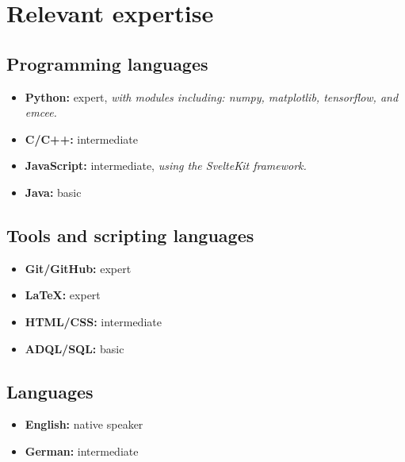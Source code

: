 \documentclass[12pt, letterpaper]{hunt-cv}
\begin{document}
\section*{Relevant expertise}

\subsection*{Programming languages}

\begin{itemize}
    \item \textbf{Python:} expert, \emph{with modules including: numpy, matplotlib, tensorflow, and emcee.}
    \item \textbf{C/C++:} intermediate
    \item \textbf{JavaScript:} intermediate, \emph{using the SvelteKit framework.}
    \item \textbf{Java:} basic
\end{itemize}

\subsection*{Tools and scripting languages}

\begin{itemize}
    \item \textbf{Git/GitHub:} expert
    \item \textbf{LaTeX:} expert
    \item \textbf{HTML/CSS:} intermediate
    \item \textbf{ADQL/SQL:} basic
\end{itemize}

\subsection*{Languages}

\begin{itemize}
    \item \textbf{English:} native speaker
    \item \textbf{German:} intermediate
\end{itemize}
\end{document}
